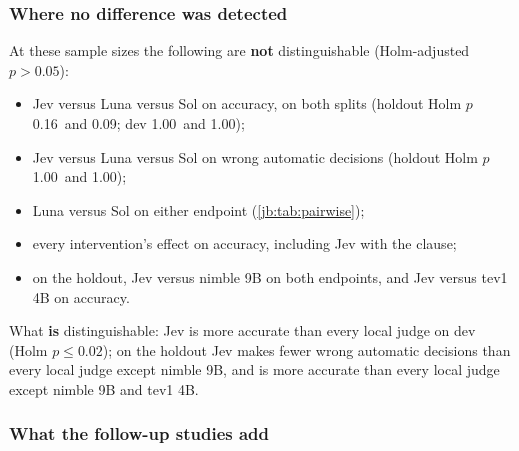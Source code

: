 \documentclass[11pt,letterpaper]{article}
\newcommand{\LunaDevRAccPHolm}{1.00}
\newcommand{\LunaHoldRAccPHolm}{0.16}
\newcommand{\LunaHoldRWaPHolm}{1.00}
\newcommand{\MaxLocalAccPHolmDev}{0.02}
\newcommand{\SolDevRAccPHolm}{1.00}
\newcommand{\SolHoldRAccPHolm}{0.09}
\newcommand{\SolHoldRWaPHolm}{1.00}
\begin{document}
\subsubsection{Where no difference was detected}

At these sample sizes the following are \textbf{not} distinguishable (Holm-adjusted $p > 0.05$):
\begin{itemize}
  \item Jev versus Luna versus Sol on accuracy, on both splits (holdout Holm $p$ \LunaHoldRAccPHolm\ and
    \SolHoldRAccPHolm; dev \LunaDevRAccPHolm\ and \SolDevRAccPHolm);
  \item Jev versus Luna versus Sol on wrong automatic decisions (holdout Holm $p$ \LunaHoldRWaPHolm\ and
    \SolHoldRWaPHolm);
  \item Luna versus Sol on either endpoint (\cref{jb:tab:pairwise});
  \item every intervention's effect on accuracy, including Jev with the clause;
  \item on the holdout, Jev versus nimble 9B on both endpoints, and Jev versus tev1 4B on accuracy.
\end{itemize}
What \textbf{is} distinguishable: Jev is more accurate than every local judge on dev (Holm $p \le
\MaxLocalAccPHolmDev$); on the holdout Jev makes fewer wrong automatic decisions than every local judge
except nimble 9B, and is more accurate than every local judge except nimble 9B and tev1 4B.

\subsubsection{What the follow-up studies add}\label{jb:sec:recs-followup}
\end{document}

